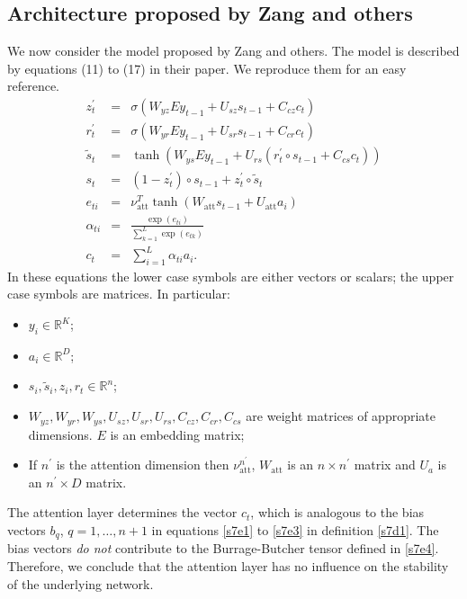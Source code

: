 \documentclass{article}
\numberwithin{equation}{section}
\begin{document}
\subsection{Architecture proposed by Zang and others}
We now consider the model proposed by Zang and others\cite{zhang2017gru}.
The model is described by equations (11) to (17) in their paper. We
reproduce them for an easy reference.
\begin{eqnarray}
z^\prime_t &=& \sigma(W_{yz}Ey_{t-1}+U_{sz}s_{t-1}+C_{cz}c_t)\label{s10e5}\\
r^\prime_t &=& \sigma(W_{yr}Ey_{t-1}+U_{sr}s_{t-1}+C_{cr}c_t)\label{s10e6}\\
\tilde{s}_t &=& \tanh\left(W_{ys}Ey_{t-1} + U_{rs}(r^\prime_t \circ
	    s_{t-1} + C_{cs}c_t)\right) \label{s10e7} \\
s_t &=& (1 - z^\prime_t)\circ s_{t-1} + z^\prime_t \circ \tilde{s}_t
    \label{s10e8} \\
e_{ti} &=& \nu^T_{\text{att}}\tanh(W_{\text{att}}s_{t-1} +
    U_\text{att}a_i)\label{s10e9} \\
\alpha_{ti} &=& 
    \frac{\exp(e_{ti})}{\sum_{k=1}^L\exp(e_{tk})}\label{s10e10}\\
c_t &=& \sum_{i=1}^L \alpha_{ti}a_i. \label{s10e11}
\end{eqnarray}
In these equations the lower case symbols are either vectors or scalars;
the upper case symbols are matrices. In particular:
\begin{itemize}
\item $y_i \in \mathbb{R}^K$;
\item $a_i \in \mathbb{R}^D$;
\item $s_i, \tilde{s}_i, z_i, r_t \in \mathbb{R}^n$;
\item $W_{yz}, W_{yr}, W_{ys}, U_{sz}, U_{sr}, U_{rs}, C_{cz}, C_{cr}, 
C_{cs}$ are weight matrices of appropriate dimensions. $E$ is an embedding
matrix;
\item If $n^\prime$ is the attention dimension then $\nu_{\text{att}}^{n
^\prime}$, $W_\text{att}$ is an $n \times n^\prime$ matrix and $U_a$ is an 
$n^\prime \times D$ matrix.
\end{itemize}
The attention layer determines the vector $c_t$, which is analogous to
the bias vectors $b_q$, $q = 1, \ldots, n + 1$ in equations \eqref{s7e1}
to \eqref{s7e3} in definition \ref{s7d1}. The bias vectors \emph{do not}
contribute to the Burrage-Butcher tensor defined in \eqref{s7e4}. Therefore,
we conclude that the attention layer has no influence on the stability of
the underlying network.
\end{document}
